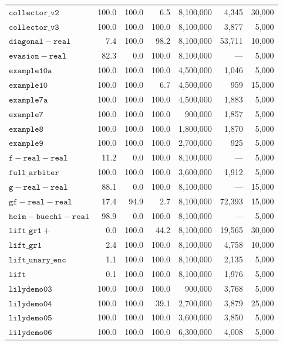 \begin{small}
\begin{longtable}{p{5cm}|rrr|rrr}
$\mathtt{collector\_v2}$ & 100.0 & 100.0 & 6.5 & 8,100,000 & 4,345 & 30,000 \\
$\mathtt{collector\_v3}$ & 100.0 & 100.0 & 100.0 & 8,100,000 & 3,877 & 5,000 \\
$\mathtt{diagonal-real}$ & 7.4 & 100.0 & 98.2 & 8,100,000 & 53,711 & 10,000 \\
$\mathtt{evasion-real}$ & 82.3 & 0.0 & 100.0 & 8,100,000 & — & 5,000 \\
$\mathtt{example10a}$ & 100.0 & 100.0 & 100.0 & 4,500,000 & 1,046 & 5,000 \\
$\mathtt{example10}$ & 100.0 & 100.0 & 6.7 & 4,500,000 & 959 & 15,000 \\
$\mathtt{example7a}$ & 100.0 & 100.0 & 100.0 & 4,500,000 & 1,883 & 5,000 \\
$\mathtt{example7}$ & 100.0 & 100.0 & 100.0 & 900,000 & 1,857 & 5,000 \\
$\mathtt{example8}$ & 100.0 & 100.0 & 100.0 & 1,800,000 & 1,870 & 5,000 \\
$\mathtt{example9}$ & 100.0 & 100.0 & 100.0 & 2,700,000 & 925 & 5,000 \\
$\mathtt{f-real-real}$ & 11.2 & 0.0 & 100.0 & 8,100,000 & — & 5,000 \\
$\mathtt{full\_arbiter}$ & 100.0 & 100.0 & 100.0 & 3,600,000 & 1,912 & 5,000 \\
$\mathtt{g-real-real}$ & 88.1 & 0.0 & 100.0 & 8,100,000 & — & 15,000 \\
$\mathtt{gf-real-real}$ & 17.4 & 94.9 & 2.7 & 8,100,000 & 72,393 & 15,000 \\
$\mathtt{heim-buechi-real}$ & 98.9 & 0.0 & 100.0 & 8,100,000 & — & 5,000 \\
$\mathtt{lift\_gr1+}$ & 0.0 & 100.0 & 44.2 & 8,100,000 & 19,565 & 30,000 \\
$\mathtt{lift\_gr1}$ & 2.4 & 100.0 & 100.0 & 8,100,000 & 4,758 & 10,000 \\
$\mathtt{lift\_unary\_enc}$ & 1.1 & 100.0 & 100.0 & 8,100,000 & 2,135 & 5,000 \\
$\mathtt{lift}$ & 0.1 & 100.0 & 100.0 & 8,100,000 & 1,976 & 5,000 \\
$\mathtt{lilydemo03}$ & 100.0 & 100.0 & 100.0 & 900,000 & 3,768 & 5,000 \\
$\mathtt{lilydemo04}$ & 100.0 & 100.0 & 39.1 & 2,700,000 & 3,879 & 25,000 \\
$\mathtt{lilydemo05}$ & 100.0 & 100.0 & 100.0 & 3,600,000 & 3,850 & 5,000 \\
$\mathtt{lilydemo06}$ & 100.0 & 100.0 & 100.0 & 6,300,000 & 4,008 & 5,000 \\

\end{longtable}
\end{small}
